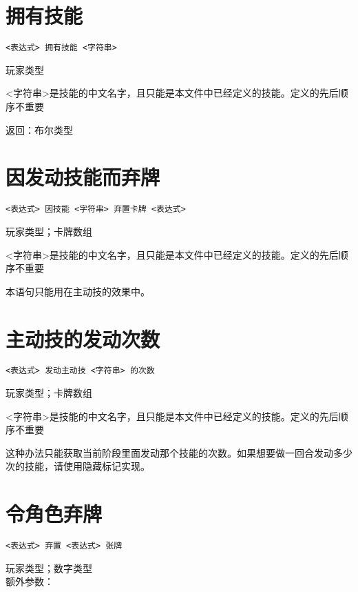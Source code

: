 \section{拥有技能}

\begin{verbatim}
<表达式> 拥有技能 <字符串>
\end{verbatim}

玩家类型

<字符串>是技能的中文名字，且只能是本文件中已经定义的技能。定义的先后顺序不重要

返回：布尔类型

\section{因发动技能而弃牌}

\begin{verbatim}
<表达式> 因技能 <字符串> 弃置卡牌 <表达式>
\end{verbatim}

玩家类型；卡牌数组

<字符串>是技能的中文名字，且只能是本文件中已经定义的技能。定义的先后顺序不重要

本语句只能用在主动技的效果中。

\section{主动技的发动次数}

\begin{verbatim}
<表达式> 发动主动技 <字符串> 的次数
\end{verbatim}

玩家类型；卡牌数组

<字符串>是技能的中文名字，且只能是本文件中已经定义的技能。定义的先后顺序不重要

这种办法只能获取当前阶段里面发动那个技能的次数。如果想要做一回合发动多少次的技能，请使用隐藏标记实现。

\section{令角色弃牌}

\begin{verbatim}
<表达式> 弃置 <表达式> 张牌
\end{verbatim}

玩家类型；数字类型 \\

额外参数：

